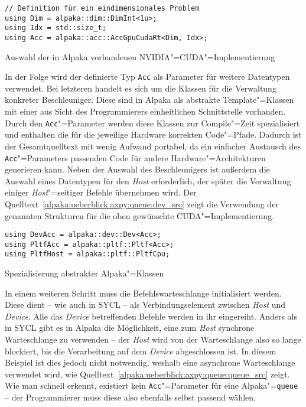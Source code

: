 \begin{code}
    \begin{verbatim}
// Definition für ein eindimensionales Problem
using Dim = alpaka::dim::DimInt<1u>;
using Idx = std::size_t;
using Acc = alpaka::acc::AccGpuCudaRt<Dim, Idx>;
    \end{verbatim}
    \caption{Auswahl der in Alpaka vorhandenen NVIDIA"=CUDA"=Implementierung}
    \label{alpaka:ueberblick:axpy:queue:acc_src}
\end{code}

In der Folge wird der definierte Typ \texttt{Acc} als Parameter für weitere
Datentypen verwendet. Bei letzteren handelt es sich um die Klassen für die
Verwaltung konkreter Beschleuniger. Diese sind in Alpaka als abstrakte
Template"=Klassen mit einer aus Sicht des Programmierers einheitlichen
Schnittstelle vorhanden. Durch den \texttt{Acc}"=Parameter werden diese Klassen
zur Compile"=Zeit spezialisiert und enthalten die für die jeweilige Hardware
korrekten Code"=Pfade. Dadurch ist der Gesamtquelltext mit wenig Aufwand
portabel, da ein einfacher Austausch des \texttt{Acc}"=Parameters passenden Code
für andere Hardware"=Architekturen generieren kann. Neben der Auswahl des
Beschleunigers ist außerdem die Auswahl eines Datentypen für den
\textit{Host} erforderlich, der später die Verwaltung einiger
\textit{Host}"=seitiger Befehle übernehmen wird. Der
Quelltext~\ref{alpaka:ueberblick:axpy:queue:dev_src} zeigt die Verwendung der
genannten Strukturen für die oben gewünschte CUDA"=Implementierung.

\begin{code}
    \begin{verbatim}
using DevAcc = alpaka::dev::Dev<Acc>;
using PltfAcc = alpaka::pltf::Pltf<Acc>;
using PltfHost = alpaka::pltf::PltfCpu;
    \end{verbatim}
    \caption{Spezialisierung abstrakter Alpaka"=Klassen}
    \label{alpaka:ueberblick:axpy:queue:dev_src}
\end{code}

In einem weiteren Schritt muss die Befehlswarteschlange initialisiert werden.
Diese dient -- wie auch in SYCL -- als Verbindungselement zwischen \textit{Host}
und \textit{Device}. Alle das \textit{Device} betreffenden Befehle werden in
ihr eingereiht. Anders als in SYCL gibt es in Alpaka die Möglichkeit, eine zum
\textit{Host} synchrone Warteschlange zu verwenden -- der \textit{Host} wird von
der Warteschlange also so lange blockiert, bis die Verarbeitung auf dem
\textit{Device} abgeschlossen ist. In diesem Beispiel ist dies jedoch nicht
notwendig, weshalb eine asynchrone Warteschlange verwendet wird, wie
Quelltext~\ref{alpaka:ueberblick:axpy:queue:queue_src} zeigt. Wie man schnell
erkennt, existiert kein \texttt{Acc}"=Parameter für eine Alpaka"=\texttt{queue}
-- der Programmierer muss diese also ebenfalls selbst passend wählen.

